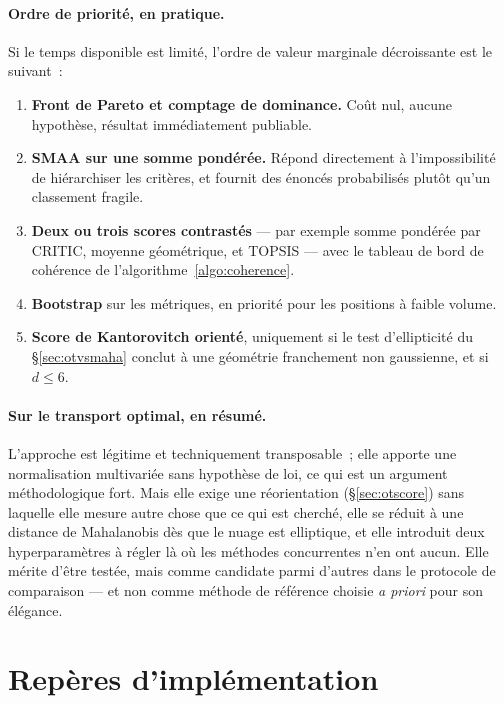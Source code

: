 \documentclass[11pt,a4paper]{article}
\theoremstyle{definition}
\theoremstyle{remark}
\begin{document}
\paragraph{Ordre de priorité, en pratique.} Si le temps disponible est limité, l'ordre de valeur
marginale décroissante est le suivant~:
\begin{enumerate}[leftmargin=1.6em,itemsep=2pt]
  \item \textbf{Front de Pareto et comptage de dominance.} Coût nul, aucune hypothèse, résultat
  immédiatement publiable.
  \item \textbf{SMAA sur une somme pondérée.} Répond directement à l'impossibilité de hiérarchiser
  les critères, et fournit des énoncés probabilisés plutôt qu'un classement fragile.
  \item \textbf{Deux ou trois scores contrastés} --- par exemple somme pondérée par CRITIC,
  moyenne géométrique, et TOPSIS --- avec le tableau de bord de cohérence de
  l'algorithme~\ref{algo:coherence}.
  \item \textbf{Bootstrap} sur les métriques, en priorité pour les positions à faible volume.
  \item \textbf{Score de Kantorovitch orienté}, uniquement si le test d'ellipticité du
  §\ref{sec:otvsmaha} conclut à une géométrie franchement non gaussienne, et si $d \le 6$.
\end{enumerate}

\paragraph{Sur le transport optimal, en résumé.} L'approche est légitime et techniquement
transposable~; elle apporte une normalisation multivariée sans hypothèse de loi, ce qui est un
argument méthodologique fort. Mais elle exige une réorientation (§\ref{sec:otscore}) sans laquelle
elle mesure autre chose que ce qui est cherché, elle se réduit à une distance de Mahalanobis dès
que le nuage est elliptique, et elle introduit deux hyperparamètres à régler là où les méthodes
concurrentes n'en ont aucun. Elle mérite d'être testée, mais comme candidate parmi d'autres dans
le protocole de comparaison --- et non comme méthode de référence choisie \emph{a priori} pour son
élégance.

\section{Repères d'implémentation}
\end{document}
